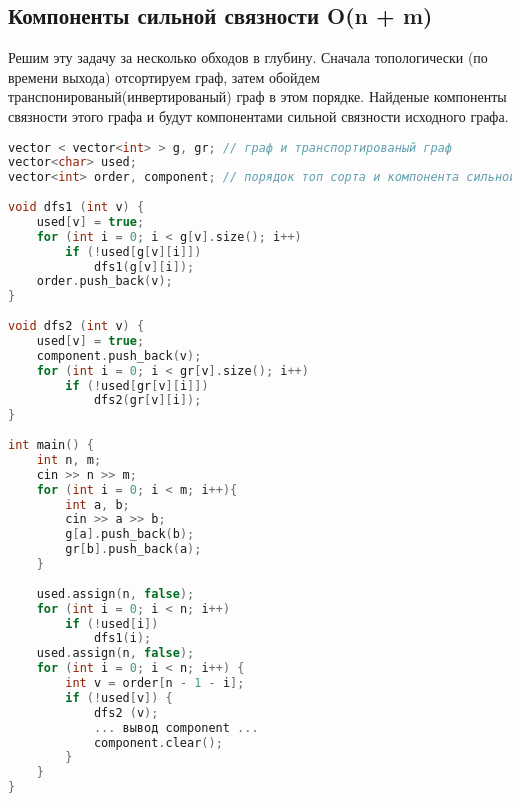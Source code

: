 \subsection{Компоненты сильной связности O(n + m)}
Решим эту задачу за несколько обходов в глубину. Сначала топологически (по времени выхода) отсортируем граф, затем обойдем транспонированый(инвертированый) граф в этом порядке. Найденые компоненты связности этого графа и будут компонентами сильной связности исходного графа.
\begin{lstlisting}[language=C++]
vector < vector<int> > g, gr; // граф и транспортированый граф
vector<char> used;
vector<int> order, component; // порядок топ сорта и компонента сильной связности
 
void dfs1 (int v) {
	used[v] = true;
	for (int i = 0; i < g[v].size(); i++)
		if (!used[g[v][i]])
			dfs1(g[v][i]);
	order.push_back(v);
}
 
void dfs2 (int v) {
	used[v] = true;
	component.push_back(v);
	for (int i = 0; i < gr[v].size(); i++)
		if (!used[gr[v][i]])
			dfs2(gr[v][i]);
}
 
int main() {
	int n, m;
	cin >> n >> m;
	for (int i = 0; i < m; i++){
		int a, b;
		cin >> a >> b;
		g[a].push_back(b);
		gr[b].push_back(a);
	}
 
	used.assign(n, false);
	for (int i = 0; i < n; i++)
		if (!used[i])
			dfs1(i);
	used.assign(n, false);
	for (int i = 0; i < n; i++) {
		int v = order[n - 1 - i];
		if (!used[v]) {
			dfs2 (v);
			... вывод component ...
			component.clear();
		}
	}
}
\end{lstlisting}
